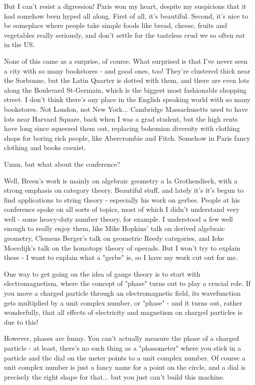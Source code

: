 But I can't resist a digression!  Paris won my heart, despite my suspicions 
that it had somehow been hyped all along.  First of all, it's beautiful. 
Second, it's nice to be someplace where people take simple foods like 
bread, cheese, fruits and vegetables really seriously, and don't settle 
for the tasteless crud we so often eat in the US.  

None of this came as a surprise, of course.  What surprised is that I've 
never seen a city with so many bookstores - and good ones, too!   They're 
clustered thick near the Sorbonne, but the Latin Quarter is dotted with 
them, and there are even lots along the Boulevard St-Germain, which is the 
biggest most fashionable shopping street.  I don't think there's any place 
in the English speaking world with so many bookstores.  Not London, not 
New York... Cambridge Massachusetts used to have lots near Harvard Square, 
back when I was a grad student, but the high rents have long since squeezed
them out, replacing bohemian diversity with clothing shops for boring rich 
people, like Abercrombie and Fitch.  Somehow in Paris fancy clothing and 
books coexist.  

Umm, but what about the conference?

Well, Breen's work is mainly on algebraic geometry a la Grothendieck, with
a strong emphasis on category theory.  Beautiful stuff, and lately it's
it's begun to find applications to string theory - especially his work on
gerbes.  People at his conference spoke on all sorts of topics, most of 
which I didn't understand very well - some heavy-duty number theory, 
for example.  I understood a few well enough to really enjoy them, like
Mike Hopkins' talk on derived algebraic geometry, Clemens Berger's talk on
geometric Reedy categories, and Ieke Moerdijk's talk on the homotopy theory
of operads.   But I won't try to explain these - I want to explain what a 
"gerbe" is, so I have my work cut out for me.

One way to get going on the idea of gauge theory is to start with
electromagnetism, where the concept of "phase" turns out to play a
crucial role.  If you move a charged particle through an electromagnetic
field, its wavefunction gets multiplied by a unit complex number, or
"phase" - and it turns out, rather wonderfully, that all effects of
electricity and magnetism on charged particles is due to this!

However, phases are funny.  You can't actually measure the phase of a
charged particle - at least, there's no such thing as a
"phasometer" where you stick in a particle and the dial on
the meter points to a unit complex number.  Of course a unit complex
number is just a fancy name for a point on the circle, and a dial is
precisely the right shape for that... but you just can't build this
machine.

